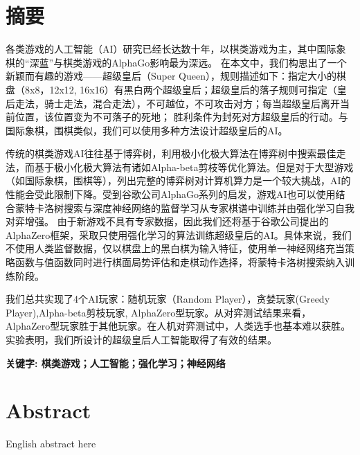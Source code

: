 \chapter*{摘要}

各类游戏的人工智能（AI）研究已经长达数十年，以棋类游戏为主，其中国际象棋的“深蓝”与棋类游戏的AlphaGo影响最为深远。
在本文中，我们构思出了一个新颖而有趣的游戏——超级皇后（Super Queen），规则描述如下：指定大小的棋盘（8x8，12x12, 16x16）有黑白两个超级皇后；超级皇后的落子规则可指定（皇后走法，骑士走法，混合走法），不可越位，不可攻击对方；每当超级皇后离开当前位置，该位置变为不可落子的死地；
胜利条件为封死对方超级皇后的行动。与国际象棋，围棋类似，我们可以使用多种方法设计超级皇后的AI。


传统的棋类游戏AI往往基于博弈树，利用极小化极大算法在博弈树中搜索最佳走法，而基于极小化极大算法有诸如Alpha-beta剪枝等优化算法。但是对于大型游戏（如国际象棋，围棋等），列出完整的博弈树对计算机算力是一个较大挑战，AI的性能会受此限制下降。受到谷歌公司AlphaGo系列的启发，游戏AI也可以使用结合蒙特卡洛树搜索与深度神经网络的监督学习从专家棋谱中训练并由强化学习自我对弈增强。
由于新游戏不具有专家数据，因此我们还将基于谷歌公司提出的AlphaZero框架，采取只使用强化学习的算法训练超级皇后的AI。具体来说，我们不使用人类监督数据，仅以棋盘上的黑白棋为输入特征，使用单一神经网络充当策略函数与值函数同时进行棋面局势评估和走棋动作选择，将蒙特卡洛树搜索纳入训练阶段。


我们总共实现了4个AI玩家：随机玩家（Random Player），贪婪玩家(Greedy Player),Alpha-beta剪枝玩家, AlphaZero型玩家。从对弈测试结果来看，AlphaZero型玩家胜于其他玩家。在人机对弈测试中，人类选手也基本难以获胜。实验表明，我们所设计的超级皇后人工智能取得了有效的结果。

\par\textbf{关键字: 棋类游戏；人工智能；强化学习；神经网络}
\chapter*{Abstract}

English abstract here
